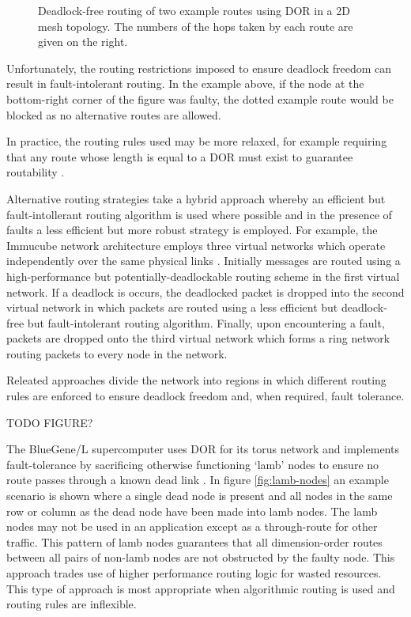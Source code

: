 			\begin{figure}
				\center
			
				\caption{Deadlock-free routing of two example routes using DOR in a 2D
				mesh topology. The numbers of the hops taken by each route are given on
				the right.}
				\label{fig:deadlock-free-dor}
			\end{figure}
			
			Unfortunately, the routing restrictions imposed to ensure deadlock
			freedom can result in fault-intolerant routing. In the example above, if
			the node at the bottom-right corner of the figure was faulty, the dotted
			example route would be blocked as no alternative routes are allowed.
			
			In practice, the routing rules used may be more relaxed, for example
			requiring that any route whose length is equal to a DOR must exist to
			guarantee routability \cite{rodrigo09}.
			
			Alternative routing strategies take a hybrid approach whereby an
			efficient but fault-intollerant routing algorithm is used where possible
			and in the presence of faults a less efficient but more robust strategy
			is employed. For example, the Immucube network architecture employs three
			virtual networks which operate independently over the same physical links
			\cite{puente07}. Initially messages are routed using a high-performance
			but potentially-deadlockable routing scheme in the first virtual network.
			If a deadlock is occurs, the deadlocked packet is dropped into the second
			virtual network in which packets are routed using a less efficient but
			deadlock-free but fault-intolerant routing algorithm. Finally, upon
			encountering a fault, packets are dropped onto the third virtual network
			which forms a ring network routing packets to every node in the network.
			
			Releated approaches \cite{mejia06,boppana95} divide the network into
			regions in which different routing rules are enforced to ensure deadlock
			freedom and, when required, fault tolerance.
			
			TODO FIGURE?
			
			The BlueGene/L supercomputer \cite{adiga02} uses DOR for its torus
			network and implements fault-tolerance by sacrificing otherwise
			functioning `lamb' nodes to ensure no route passes through a known dead
			link \cite{ho04}. In figure \ref{fig:lamb-nodes} an example scenario is
			shown where a single dead node is present and all nodes in the same row
			or column as the dead node have been made into lamb nodes. The lamb nodes
			may not be used in an application except as a through-route for other
			traffic. This pattern of lamb nodes guarantees that all dimension-order
			routes between all pairs of non-lamb nodes are not obstructed by the
			faulty node. This approach trades use of higher performance routing
			logic for wasted resources. This type of approach is most appropriate
			when algorithmic routing is used and routing rules are inflexible.
			
